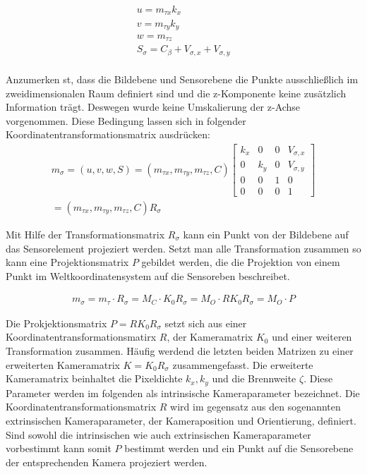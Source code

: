 \begin{gather}	
	{u}=m_{\tau x} k_x \\
	{v}=m_{\tau y} k_y \\
	{w}=m_{\tau z} \\
	S_\sigma = C_{\beta} + V_{\sigma,x} + V_{\sigma,y}\\
\end{gather}

Anzumerken st, dass die Bildebene und Sensorebene die Punkte ausschließlich im zweidimensionalen Raum definiert sind und die z-Komponente keine zusätzlich Information trägt. Deswegen wurde keine Umskalierung der z-Achse vorgenommen. Diese Bedingung lassen sich in folgender Koordinatentransformationsmatrix ausdrücken:
\begin{gather}
	m_\sigma=({u},{v},{w},S)=(m_{\tau x},m_{\tau y},m_{\tau z},C)
	\begin{bmatrix}
		k_x&0&0&V_{\sigma,x}\\
		0&k_y&0&V_{\sigma,y}\\
		0&0&1&0\\
		0&0&0&1
	\end{bmatrix}\\
	=(m_{\tau x},m_{\tau y},m_{\tau z},C) R_\sigma
\end{gather}

Mit Hilfe der Transformationsmatrix $R_\sigma$ kann ein Punkt von der Bildebene auf das Sensorelement projeziert werden.
Setzt man alle Transformation zusammen so kann eine Projektionsmatrix $P$ gebildet werden, die die Projektion von einem Punkt im Weltkoordinatensystem auf die Sensoreben beschreibet. 



\begin{gather}
	m_\sigma = m_\tau \cdot R_\sigma = M_C \cdot K_0R_\sigma= M_O \cdot RK_0R_\sigma= M_O \cdot P
\end{gather}


Die Prokjektionsmatrix $P=RK_0R_\sigma$ setzt sich aus einer Koordinatentransformationsmatirx $R$, der Kameramatrix $K_0$ und einer weiteren Transformation zusammen. Häufig werdend die letzten beiden Matrizen zu einer erweiterten Kameramatrix $K=K_0R_\sigma$ zusammengefasst. Die erweiterte Kameramatrix beinhaltet die Pixeldichte $k_x,k_y$ und die Brennweite $\zeta$. Diese Parameter werden im folgenden als intrinsische Kameraparameter bezeichnet. Die Koordinatentransformationsmatrix $R$ wird im gegensatz aus den sogenannten extrinsischen Kameraparameter, der Kameraposition und Orientierung, definiert. Sind sowohl die intrinsischen wie auch extrinsischen Kameraparameter vorbestimmt kann somit $P$ bestimmt werden und ein Punkt auf die Sensorebene der entsprechenden Kamera projeziert werden. 


